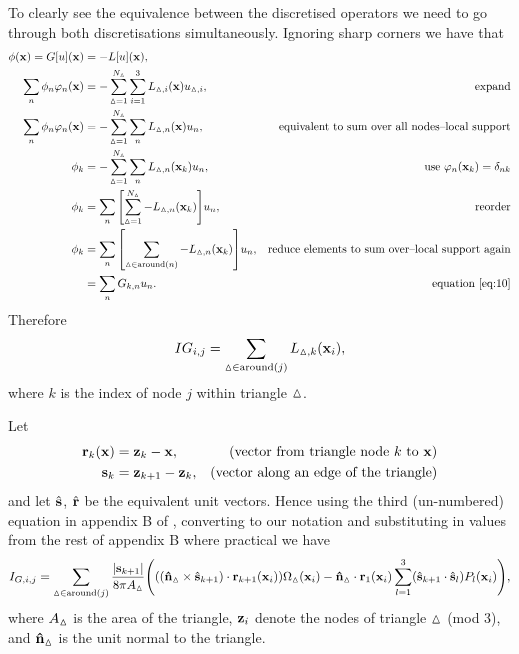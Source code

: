 To clearly see the equivalence between the discretised operators we need to go through both discretisations simultaneously.
Ignoring sharp corners we have that
\begin{equation}
  \begin{aligned}
    \phim(\xv) = G[\phione](\xv) &= -L[\phione](\xv), \\
    \sum_{n} \phim_n \tbf_n(\xv) 
    &= - \sum_{\tri=1}^{N_\tri} \sum_{i=1}^{3} L_{\tri,i}(\xv) \phione_{\tri,i}, 
    \quad\quad&\text{expand}\\
    \sum_{n} \phim_n \tbf_n(\xv) 
    &= - \sum_{\tri=1}^{N_\tri} \sum_n L_{\tri,n}(\xv) \phione_n, 
    &\text{equivalent to sum over all nodes--local support}\\
    \phim_k &= - \sum_{\tri=1}^{N_\tri} \sum_n L_{\tri,n}(\xv_k) \phione_n, 
    &\text{use $\tbf_n(\xv_k) = \delta_{nk}$}\\
    \phim_k &= \sum_n \bigs{\sum_{\tri=1}^{N_\tri} -L_{\tri,n}(\xv_k)} \phione_n, 
    &\text{reorder}\\
    \phim_k &= \sum_n \bigs{\sum_{\tri \in \text{around}(n)} -L_{\tri,n}(\xv_k)} \phione_n,
    &\text{reduce elements to sum over--local support again}\\
    &= \sum_n G_{k,n} \phione_n. 
    &\text{equation~\cref{eq:10}}
  \end{aligned}
\end{equation}
Therefore 
\begin{equation}
  IG_{i,j} = \sum_{\vartriangle \in \text{around}(j)} L_{\vartriangle,k}(\mathbf{x}_i),
\end{equation}
where $k$ is the index of node $j$ within triangle $\vartriangle$.

Let
\begin{equation}
  \begin{aligned}
    \mathbf{r}_k(\mathbf{x}) &= \mathbf{z}_k - \mathbf{x}, &\quad \text{(vector from triangle node $k$ to $\mathbf{x}$)} \\
    {\mathbf{s}}_k &= \mathbf{z}_{k+1} - \mathbf{z}_k, & \text{(vector along an edge of the triangle)} \\
  \end{aligned}
\end{equation}
and let $\hat{{\mathbf{s}}}$, $\hat{\mathbf{r}}$ be the equivalent unit vectors.
Hence using the third (un-numbered) equation in appendix B of \cite{Lindholm1984}, converting to our notation and substituting in values from the rest of appendix B where practical we have
\begin{equation}
  \begin{aligned}
    \label{eq:analytic-bem-integral}
    I_{G,i,j} &= \sum_{\vartriangle \in \text{around}(j)} \frac{\left|{{\mathbf{s}}_{k+1}} \right|}{8 \pi A_\vartriangle} {\left( 
      {\left( (\mathbf{\hat{n}}_\vartriangle \times \hat{{\mathbf{s}}}_{k+1}) \cdot \mathbf{r}_{k+1}(\mathbf{x}_i) \right)} \Omega_\vartriangle(\mathbf{x}_i) 
      - \mathbf{\hat{n}}_\vartriangle \cdot \mathbf{r}_1(\mathbf{x}_i) \sum_{l=1}^{3} (\hat{{\mathbf{s}}}_{k+1} \cdot \hat{{\mathbf{s}}}_l) P_l(\mathbf{x}_i)
     \right)}, \\
  \end{aligned}
\end{equation} 
where $A_\vartriangle$ is the area of the triangle, $\mathbf{z}_i$ denote the nodes of triangle $\vartriangle$ (mod 3), and $\mathbf{\hat{n}}_\vartriangle$ is the unit normal to the triangle.

